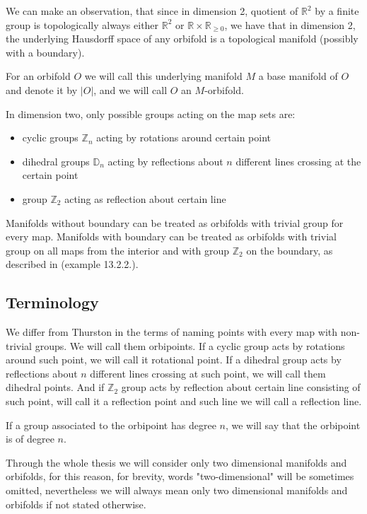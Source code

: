 We can make an observation, that since in dimension 2, quotient of $\mathbb{R}^2$ by a finite 
group is topologically always either $\mathbb{R}^2$ or $\mathbb{R}\times\mathbb{R}_{\geq 0}$, 
we have that in dimension 2, the underlying Hausdorff space of any orbifold is a topological 
manifold (possibly with a boundary).

For an orbifold $O$ we will call this underlying manifold $M$
a base manifold of $O$ and denote it by $|O|$,
and we will call $O$ an $M$-orbifold.  

In dimension two, only possible groups acting on the map sets are:
\begin{itemize}
\item cyclic groups $\mathbb{Z}_n$ acting by rotations around certain point
\item dihedral groups $\mathbb{D}_n$ acting by reflections about $n$ different lines 
crossing at the certain point 
\item group $\mathbb{Z}_2$ acting as reflection about certain line
\end{itemize}

Manifolds without boundary can be treated as orbifolds with trivial group for every map.
Manifolds with boundary can be treated as orbifolds with trivial group on all maps from the 
interior and with group $\mathbb{Z}_2$ on the boundary, as described in \cite{Thurston1979} 
(example 13.2.2.).

\subsection{Terminology}
We differ from Thurston in the terms of naming points with every map with non-trivial groups. 
We will call them orbipoints. If a cyclic group acts by rotations 
around such point, we will call it rotational point. 
If a dihedral group acts by reflections about $n$ different lines 
crossing at such point, we will 
call them 
dihedral points. And if $\mathbb{Z}_2$ group acts by reflection about certain line consisting 
of such point, will call it a 
reflection point and such line we will call a reflection line. 

If a group associated to the orbipoint has degree $n$, we will say that the orbipoint is 
of degree $n$.

Through the whole thesis we will consider only two dimensional manifolds and 
orbifolds, for this reason, for brevity, 
words "two-dimensional" will be sometimes omitted, nevertheless 
we will always mean only two dimensional manifolds and orbifolds if not stated otherwise. 
 

